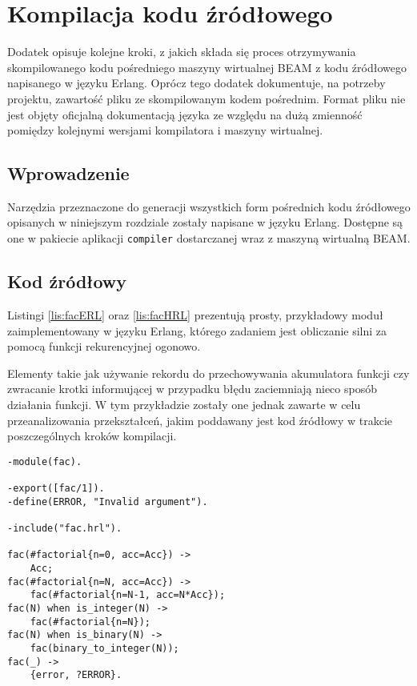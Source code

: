 \chapter{Kompilacja kodu źródłowego}
\label{cha:erlangKompilacja}

Dodatek opisuje kolejne kroki, z jakich składa się proces otrzymywania skompilowanego kodu pośredniego maszyny wirtualnej BEAM z kodu źródłowego napisanego w języku Erlang.
Oprócz tego dodatek dokumentuje, na potrzeby projektu, zawartość pliku ze skompilowanym kodem pośrednim.  Format pliku nie jest objęty oficjalną dokumentacją języka ze względu na dużą zmienność pomiędzy kolejnymi wersjami kompilatora i maszyny wirtualnej.

\section{Wprowadzenie}

Narzędzia przeznaczone do generacji wszystkich form pośrednich kodu źródłowego opisanych w niniejszym rozdziale zostały napisane w języku Erlang. Dostępne są one w pakiecie aplikacji \texttt{compiler} dostarczanej wraz z maszyną wirtualną BEAM.

\section{Kod źródłowy}

Listingi \ref{lis:facERL} oraz \ref{lis:facHRL} prezentują prosty, przykładowy moduł zaimplementowany w języku Erlang, którego zadaniem jest obliczanie silni za pomocą funkcji rekurencyjnej ogonowo.

Elementy takie jak używanie rekordu do przechowywania akumulatora funkcji czy zwracanie krotki informującej w przypadku błędu zaciemniają nieco sposób działania funkcji. W tym przykładzie zostały one jednak zawarte w celu przeanalizowania przekształceń, jakim poddawany jest kod źródłowy w trakcie poszczególnych kroków kompilacji.

\begin{lstlisting}[style=erlang, caption=Plik fac.erl, label=lis:facERL]
-module(fac).

-export([fac/1]).
-define(ERROR, "Invalid argument").

-include("fac.hrl").

fac(#factorial{n=0, acc=Acc}) ->
    Acc;
fac(#factorial{n=N, acc=Acc}) ->
    fac(#factorial{n=N-1, acc=N*Acc});
fac(N) when is_integer(N) ->
    fac(#factorial{n=N});
fac(N) when is_binary(N) ->
    fac(binary_to_integer(N));
fac(_) ->
    {error, ?ERROR}.
\end{lstlisting}

